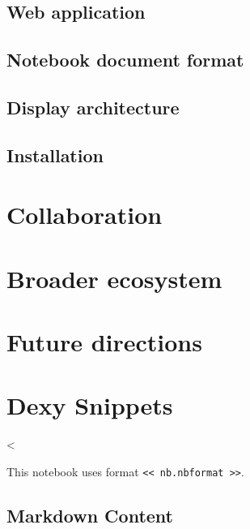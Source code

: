 \documentclass[12pt]{article}
\begin{document}
\subsection{Web application}

%

\subsection{Notebook document format}

\subsection{Display architecture}

\subsection{Installation}

\section{Collaboration}

\section{Broader ecosystem}

\section{Future directions}

\section*{Dexy Snippets}

<%

This notebook uses format \verb|<< nb.nbformat >>|.

\subsection*{Markdown Content}
\end{document}
